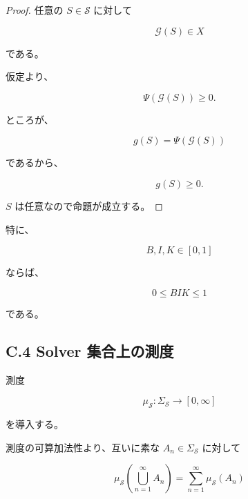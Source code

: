 \documentclass[a4paper,11pt]{article}
\newcommand{\Solver}{\mathcal{S}}
\newcommand{\Eval}{\mathcal{G}}
\newcommand{\EvalMap}{\Psi}
\begin{document}
\begin{proof}
任意の $S\in\Solver$ に対して

\begin{equation}
    \Eval(S)\in X
\end{equation}

である。

仮定より、

\begin{equation}
    \EvalMap(\Eval(S))\geq0.
\end{equation}

ところが、

\begin{equation}
    g(S)=\EvalMap(\Eval(S))
\end{equation}

であるから、

\begin{equation}
    g(S)\geq0.
\end{equation}

$S$ は任意なので命題が成立する。
\end{proof}

特に、

\begin{equation}
    B,I,K\in[0,1]
\end{equation}

ならば、

\begin{equation}
    0\leq BIK\leq1
\end{equation}

である。


\subsection{C.4 Solver 集合上の測度}

測度

\begin{equation}
    \mu_{\Solver}:
    \Sigma_{\Solver}\to[0,\infty]
\end{equation}

を導入する。

測度の可算加法性より、互いに素な
$A_n\in\Sigma_{\Solver}$ に対して

\begin{equation}
    \mu_{\Solver}
    \left(
        \bigcup_{n=1}^{\infty}A_n
    \right)
    =
    \sum_{n=1}^{\infty}
    \mu_{\Solver}(A_n)
\end{equation}
\end{document}

